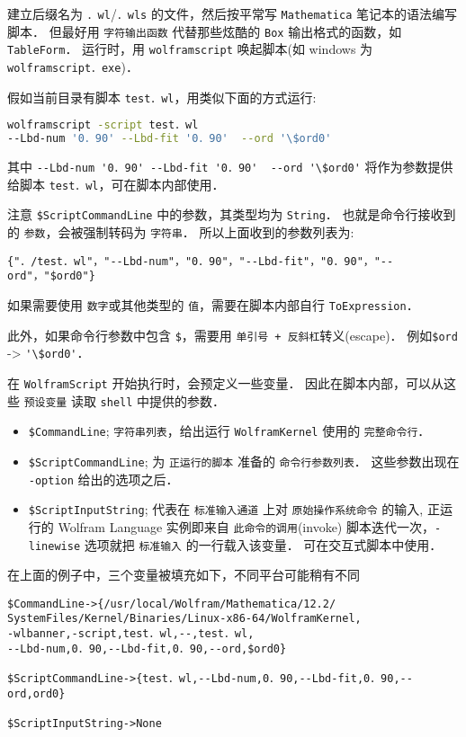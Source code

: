 建立后缀名为 \verb`．wl`/\verb`．wls` 的文件，然后按平常写 \verb`Mathematica` 笔记本的语法编写脚本．
但最好用 \verb`字符输出函数` 代替那些炫酷的 \verb`Box` 输出格式的函数，如 \verb`TableForm`．
运行时，用 \verb`wolframscript` 唤起脚本(如 windows 为 \verb`wolframscript．exe`)．

假如当前目录有脚本 \verb`test．wl`，用类似下面的方式运行:
\begin{lstlisting}[language=bash]
wolframscript -script test．wl  
--Lbd-num '0．90' --Lbd-fit '0．90'  --ord '\$ord0'
\end{lstlisting}

其中 \verb`--Lbd-num '0．90' --Lbd-fit '0．90'  --ord '\$ord0'` 将作为参数提供给脚本 \verb`test．wl`，可在脚本内部使用．

注意 \verb`$ScriptCommandLine` 中的参数，其类型均为 \verb`String`．
也就是命令行接收到的 \verb`参数`，会被强制转码为 \verb`字符串`．
所以上面收到的参数列表为:
\begin{lstlisting}[language=wolfram]
{"．/test．wl"，"--Lbd-num"，"0．90"，"--Lbd-fit"，"0．90"，"--ord"，"$ord0"}
\end{lstlisting}

如果需要使用 \verb`数字`或其他类型的 \verb`值`，需要在脚本内部自行 \verb`ToExpression`．

此外，如果命令行参数中包含 \verb`$`，需要用 \verb`单引号 + 反斜杠`转义(escape)．
例如\verb`$ord` -> \verb`'\$ord0'`．

在 \verb`WolframScript` 开始执行时，会预定义一些变量．
因此在脚本内部，可以从这些 \verb`预设变量` 读取 \verb`shell` 中提供的参数．

\begin{itemize}
\item \verb`$CommandLine`; \verb`字符串列表`，给出运行 \verb`WolframKernel` 使用的 \verb`完整命令行`．
\item \verb`$ScriptCommandLine`; 为 \verb`正运行的脚本` 准备的 \verb`命令行参数列表`．
这些参数出现在 \verb`-option` 给出的选项之后．
\item \verb`$ScriptInputString`; 代表在 \verb`标准输入通道` 上对 \verb`原始操作系统命令` 的输入,
正运行的 Wolfram Language 实例即来自 \verb`此命令的调用`(invoke)
脚本迭代一次，\verb`-linewise` 选项就把 \verb`标准输入` 的一行载入该变量．
可在交互式脚本中使用．
\end{itemize}


在上面的例子中，三个变量被填充如下，不同平台可能稍有不同

\begin{lstlisting}
$CommandLine->{/usr/local/Wolfram/Mathematica/12.2/
SystemFiles/Kernel/Binaries/Linux-x86-64/WolframKernel,
-wlbanner,-script,test．wl,--,test．wl,
--Lbd-num,0．90,--Lbd-fit,0．90,--ord,$ord0}

$ScriptCommandLine->{test．wl,--Lbd-num,0．90,--Lbd-fit,0．90,--ord,ord0}

$ScriptInputString->None
\end{lstlisting}

